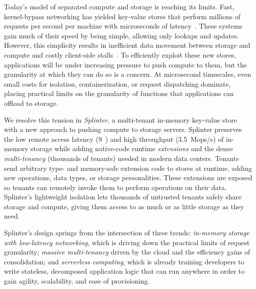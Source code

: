Today's model of separated compute and storage is reaching its limits.  Fast,
  kernel-bypass networking has yielded key-value stores that perform
  millions of requests per second per machine with microseconds of
  latency~\cite{farm-2014,fasst-2016,mica,ramcloud,drtm}.
These systems gain much of their speed by being simple, allowing only lookups
  and updates.
However, this simplicity results in inefficient data movement between storage and
  compute and costly client-side stalls~\cite{killer-microseconds,grappa}.
To efficiently exploit these new stores, applications will be under
  increasing pressure to push compute to them, but the granularity at which
  they can do so is a concern.
At microsecond timescales, even small costs for isolation, containerization, or
  request dispatching dominate, placing practical limits on the granularity of
  functions that applications can offload to storage.

We resolve this tension in \textsl{Splinter}, a multi-tenant in-memory key-value store with
  a new approach to pushing compute to storage servers.
Splinter preserves the low remote access latency (9~\us) and high throughput (3.5~Mops/s)
  of in-memory storage
  while adding native-code runtime \textsl{extensions} and the dense
  \textsl{multi-tenancy} (thousands of tenants) needed in modern data centers.
Tenants send arbitrary type- and memory-safe extension code to
  stores at runtime, adding new operations, data types, or
  storage personalities.
These extensions are exposed so tenants can remotely
  invoke them to perform operations on
  their data.
Splinter's lightweight isolation lets thousands of untrusted tenants
  safely share storage and compute, giving them access to as
  much or as little storage as they need.

Splinter's design springs from the intersection of three trends:
  \textsl{in-memory storage with low-latency networking}, which is driving down
  the practical limits of request granularity;
\textsl{massive multi-tenancy} driven by the cloud and the efficiency gains of
  consolidation;
and \textsl{serverless computing}, which is already training developers to
  write stateless, decomposed application logic that can run anywhere in order to gain agility,
  scalability, and ease of provisioning.

